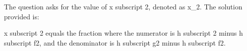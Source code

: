 The question asks for the value of x subscript 2, denoted as x_2. The solution provided is:

x subscript 2 equals the fraction where the numerator is h subscript 2 minus h subscript f2, and the denominator is h subscript g2 minus h subscript f2.